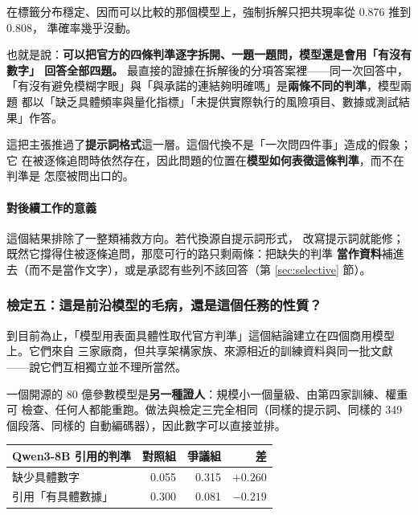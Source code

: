 \documentclass[11pt,a4paper]{ctexart}
\begin{document}
\begin{tcolorbox}[colback=red!5, colframe=red!50, title=結論：塌縮撐得住被直接問]
在標籤分布穩定、因而可以比較的那個模型上，強制拆解只把共現率從 0.876 推到 0.808，
準確率幾乎沒動。

\medskip
也就是說：\textbf{可以把官方的四條判準逐字拆開、一題一題問，模型還是會用「有沒有數字」
回答全部四題。} 最直接的證據在拆解後的分項答案裡——同一次回答中，
「有沒有避免模糊字眼」與「與承諾的連結夠明確嗎」是\textbf{兩條不同的判準}，模型兩題
都以「缺乏具體頻率與量化指標」「未提供實際執行的風險項目、數據或測試結果」作答。

\medskip
這把主張推過了\textbf{提示詞格式}這一層。這個代換不是「一次問四件事」造成的假象；它
在被逐條追問時依然存在，因此問題的位置在\textbf{模型如何表徵這條判準}，而不在判準是
怎麼被問出口的。
\end{tcolorbox}

\paragraph{對後續工作的意義} 這個結果排除了一整類補救方向。若代換源自提示詞形式，
改寫提示詞就能修；既然它撐得住被逐條追問，那麼可行的路只剩兩條：把缺失的判準
\textbf{當作資料}補進去（而不是當作文字），或是承認有些列不該回答（第
\ref{sec:selective} 節）。

\subsubsection{檢定五：這是前沿模型的毛病，還是這個任務的性質？}
\label{sec:openrep}

到目前為止，「模型用表面具體性取代官方判準」這個結論建立在四個商用模型上。它們來自
三家廠商，但共享架構家族、來源相近的訓練資料與同一批文獻——說它們互相獨立並不理所當然。

一個開源的 80 億參數模型是\textbf{另一種證人}：規模小一個量級、由第四家訓練、權重可
檢查、任何人都能重跑。做法與檢定三完全相同（同樣的提示詞、同樣的 349 個段落、同樣的
自動編碼器），因此數字可以直接並排。

\begin{table}[h]
\centering\small
\begin{tabular}{@{}lrrr@{}}
\toprule
Qwen3-8B 引用的判準 & 對照組 & 爭議組 & 差 \\
\midrule
缺少具體數字 & 0.055 & 0.315 & $+0.260$ \\
引用「有具體數據」 & 0.300 & 0.081 & $-0.219$ \\
\bottomrule
\end{tabular}
\end{table}
\end{document}
